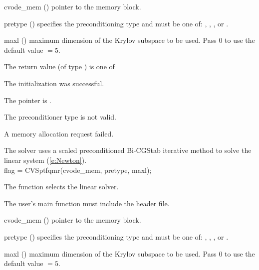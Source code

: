 {
  \begin{args}
  \item[cvode\_mem] ()
    pointer to the {\cvode} memory block.
  \item[pretype] ()
    specifies the preconditioning type and must be one of: 
    , , , or .
  \item[maxl] ()
    maximum dimension of the Krylov subspace to be used. Pass $0$ to use the 
    default value  $= 5$.
  \end{args}
}
{
  The return value  (of type ) is one of
  \begin{args}
  \item[\Id{CVSPBCG\_SUCCESS}] 
    The {\cvspbcg} initialization was successful.
  \item[\Id{CVSPBCG\_MEM\_NULL}]
    The  pointer is .
  \item[\Id{CVSPBCG\_ILL\_INPUT}]
    The preconditioner type  is not valid.
  \item[\Id{CVSPBCG\_MEM\_FAIL}]
    A memory allocation request failed.
  \end{args}
}
{
  The {\cvspbcg} solver uses a scaled preconditioned Bi-CGStab
  iterative method to solve the linear system (\ref{e:Newton}).\\
}
{
  flag = CVSptfqmr(cvode\_mem, pretype, maxl);
}
{
  The function  selects the {\cvsptfqmr} linear solver. 

  The user's main function must include the  header file.
}
{
  \begin{args}
  \item[cvode\_mem] ()
    pointer to the {\cvode} memory block.
  \item[pretype] ()
    specifies the preconditioning type and must be one of: 
    , , , or .
  \item[maxl] ()
    maximum dimension of the Krylov subspace to be used. Pass $0$ to use the 
    default value  $= 5$.
  \end{args}
}

